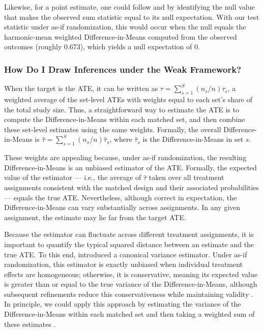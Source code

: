 \documentclass[
  12pt,
  leqno]{article}
\begin{document}
\doublespacing

Likewise, for a point estimate, one could follow
\citet{hodgeslehmann1963} and \citet{rosenbaum1993} by identifying the
null value that makes the observed sum statistic equal to its null
expectation. With our test statistic under as-if randomization, this
would occur when the null equals the harmonic-mean weighted
Difference-in-Means computed from the observed outcomes (roughly 0.673),
which yields a null expectation of \(0\).

\subsubsection{How Do I Draw Inferences under the Weak
Framework?}\label{how-do-i-draw-inferences-under-the-weak-framework}

When the target is the ATE, it can be written as
\(\tau = \sum_{s = 1}^S (n_s / n)\tau_s\), a weighted average of the
set-level ATEs with weights equal to each set's share of the total study
size. Thus, a straightforward way to estimate the ATE is to compute the
Difference-in-Means within each matched set, and then combine these
set-level estimates using the same weights. Formally, the overall
Difference-in-Means is
\(\hat{\tau} = \sum_{s=1}^S (n_s / n) \hat{\tau}_s\), where
\(\hat{\tau}_s\) is the Difference-in-Means in set \(s\).

These weights are appealing because, under as-if randomization, the
resulting Difference-in-Means is an unbiased estimator of the ATE.
Formally, the expected value of the estimator --- i.e., the average of
\(\hat{\tau}\) taken over all treatment assignments consistent with the
matched design and their associated probabilities --- equals the true
ATE. Nevertheless, although correct in expectation, the
Difference-in-Means can vary substantially across assignments. In any
given assignment, the estimate may lie far from the target ATE.

Because the estimator can fluctuate across different treatment
assignments, it is important to quantify the typical squared distance
between an estimate and the true ATE. To this end, \citet{neyman1923}
introduced a canonical variance estimator. Under as-if randomization,
this estimator is exactly unbiased when individual treatment effects are
homogeneous; otherwise, it is conservative, meaning its expected value
is greater than or equal to the true variance of the
Difference-in-Means, although subsequent refinements reduce this
conservativeness while maintaining validity
\citep[see][]{robins1988, aronowetal2014, harshawetal2024}. In
principle, we could apply this approach by estimating the variance of
the Difference-in-Means within each matched set and then taking a
weighted sum of these estimates \citep[see, e.g.,][]{miratrixetal2013}.
\end{document}
